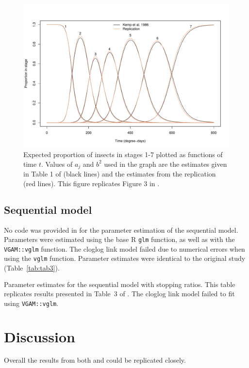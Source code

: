 \begin{figure}
  \centering
  \includegraphics[width=\textwidth]{../figures/dennis_fig3.pdf}
  \caption{Expected proportion of insects in stages 1-7 plotted as functions of time $t$. Values of $a_j$ and $b^2$ used in the graph are the estimates given in Table 1 of \citep{kemp1986stochastic} (black lines) and the estimates from the replication (red lines). This figure replicates Figure 3 in \citep{dennis1986stochastic}.}
  \label{fig:fig2}
\end{figure}

\subsection{Sequential model}
No code was provided in \citep{candy1991modeling} for the parameter estimation of the sequential model. Parameters were estimated using the base R \verb+glm+ function, as well as with the  \verb+VGAM::vglm+ function. The cloglog link model failed due to numerical errors when using the \verb+vglm+ function. Parameter estimates were identical to the original study (Table~\ref{tab:tab3}).

\begin{table}
  \small
    \centering
    \caption{Parameter estimates for the sequential model with stopping ratios. This table replicates results presented in Table~3 of \citep{candy1991modeling}. The cloglog link model failed to fit using \texttt{VGAM::vglm}.}
  
  \label{tab:tab3}
\end{table}

\section{Discussion}
Overall the results from both \citep{dennis1986stochastic} and \citep{candy1991modeling} could be replicated closely.


